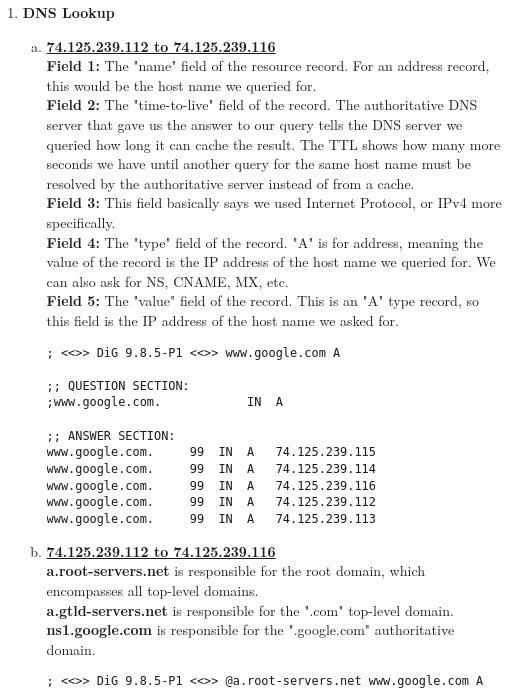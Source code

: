 \documentclass[11pt,fleqn]{article}
\begin{document}
\begin{enumerate}[Q1.]

\item  \textbf{DNS Lookup}
\begin{enumerate}[(a)]
\item \textbf{\underline{74.125.239.112 to 74.125.239.116}} \\
\textbf{Field 1:} The "name" field of the resource record. For an address record, this would be the host name we queried for. \\
\textbf{Field 2:} The "time-to-live" field of the record. The authoritative DNS server that gave us the answer to our query tells the DNS server we queried how long it can cache the result. The TTL shows how many more seconds we have until another query for the same host name must be resolved by the authoritative server instead of from a cache. \\
\textbf{Field 3:} This field basically says we used Internet Protocol, or IPv4 more specifically. \\
\textbf{Field 4:} The "type" field of the record. "A" is for address, meaning the value of the record is the IP address of the host name we queried for. We can also ask for NS, CNAME, MX, etc. \\
\textbf{Field 5:} The "value" field of the record. This is an "A" type record, so this field is the IP address of the host name we asked for.
\begin{verbatim}
; <<>> DiG 9.8.5-P1 <<>> www.google.com A

;; QUESTION SECTION:
;www.google.com.			IN	A

;; ANSWER SECTION:
www.google.com.		99	IN	A	74.125.239.115
www.google.com.		99	IN	A	74.125.239.114
www.google.com.		99	IN	A	74.125.239.116
www.google.com.		99	IN	A	74.125.239.112
www.google.com.		99	IN	A	74.125.239.113
\end{verbatim}
\item \textbf{\underline{74.125.239.112 to 74.125.239.116}} \\
\textbf{a.root-servers.net} is responsible for the root domain, which encompasses all top-level domains. \\
\textbf{a.gtld-servers.net} is responsible for the ".com" top-level domain. \\
\textbf{ns1.google.com} is responsible for the ".google.com" authoritative domain.
\begin{verbatim}
; <<>> DiG 9.8.5-P1 <<>> @a.root-servers.net www.google.com A


\end{verbatim}
\end{enumerate}
\end{enumerate}
\end{document}
